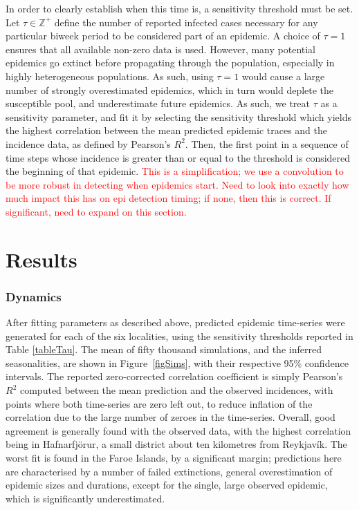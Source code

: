 \documentclass[10pt]{article}
\begin{document}
In order to clearly establish when this time is, a sensitivity threshold must be set. Let $\tau \in \mathbb{Z}^+$ define the number of reported infected cases necessary for any particular biweek period to be considered part of an epidemic. A choice of $\tau = 1$ ensures that all available non-zero data is used. However, many potential epidemics go extinct before propagating through the population, especially in highly heterogeneous populations. As such, using $\tau=1$ would cause a large number of strongly overestimated epidemics, which in turn would deplete the susceptible pool, and underestimate future epidemics. As such, we treat $\tau$ as a sensitivity parameter, and fit it by selecting the sensitivity threshold which yields the highest correlation between the mean predicted epidemic traces and the incidence data, as defined by Pearson's $R^2$. Then, the first point in a sequence of time steps whose incidence is greater than or equal to the threshold is considered the beginning of that epidemic. \textcolor{red}{This is a simplification; we use a convolution to be more robust in detecting when epidemics start. Need to look into exactly how much impact this has on epi detection timing; if none, then this is correct. If significant, need to expand on this section.}




















\section*{Results}

\subsubsection*{Dynamics}

After fitting parameters as described above, predicted epidemic time-series were generated for each of the six localities, using the sensitivity thresholds reported in Table \ref{tableTau}. The mean of fifty thousand simulations, and the inferred seasonalities, are shown in Figure~\ref{figSims}, with their respective 95\% confidence intervals. The reported zero-corrected correlation coefficient is simply Pearson's $R^2$ computed between the mean prediction and the observed incidences, with points where both time-series are zero left out, to reduce inflation of the correlation due to the large number of zeroes in the time-series. Overall, good agreement is generally found with the observed data, with the highest correlation being in Hafnarfj\"{o}r\dh{}ur, a small district about ten kilometres from Reykjav\'{i}k. The worst fit is found in the Faroe Islands, by a significant margin; predictions here are characterised by a number of failed extinctions, general overestimation of epidemic sizes and durations, except for the single, large observed epidemic, which is significantly underestimated. 
\end{document}
